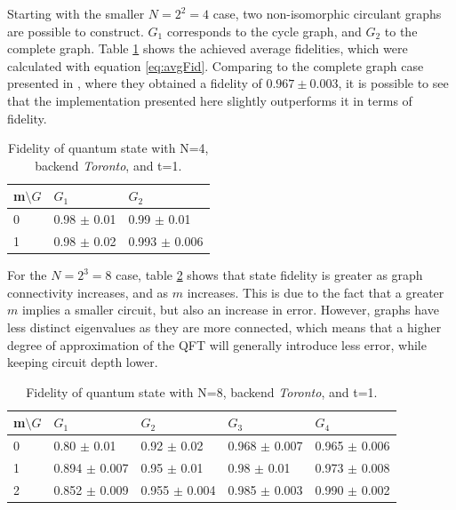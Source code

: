 \documentclass[../../dissertation.tex]{subfiles}
\begin{document}
Starting with the smaller $N = 2^2 = 4$ case, two non-isomorphic circulant
graphs are possible to construct. $G_1$ corresponds to the cycle graph, and
$G_2$ to the complete graph. Table \ref{tab:N2TRT} shows the achieved average
fidelities, which were calculated with equation \ref{eq:avgFid}. Comparing to
the complete graph case presented in \cite{qiang2016}, where they obtained a
fidelity of $0.967 \pm 0.003$, it is possible to see that the implementation
presented here slightly outperforms it in terms of fidelity.
\begin{table}[!h]
\centering
\begin{tabular}{| l | l | l |}
\hline
m$\setminus G$ & $G_1$               & $G_2$  \\ \hline
0   & 0.98 $\pm$ 0.01 & 0.99 $\pm$ 0.01  \\\hline
1   & 0.98 $\pm$ 0.02 & 0.993 $\pm$ 0.006   \\\hline
\end{tabular}
\caption{Fidelity of quantum state with N=4, backend \textit{Toronto}, and t=1.}
\label{tab:N2TRT}
\end{table}\par

For the $N = 2^3 = 8$ case, table \ref{tab:N3TRT} shows that state fidelity is
greater as graph connectivity increases, and as $m$ increases. This is due to
the fact that a greater $m$ implies a smaller circuit, but also an increase in
error. However, graphs have less distinct eigenvalues as they are more
connected, which means that a higher degree of approximation of the QFT will
generally introduce less error, while keeping circuit depth
lower.
\begin{table}[!h]
\centering
\begin{tabular}{| l | l | l | l | l |}
\hline
m$\setminus G$ & $G_1$                & $G_2$                & $G_3$                & $G_4$    \\\hline
0   & 0.80 $\pm$ 0.01 & 0.92 $\pm$ 0.02     & 0.968 $\pm$ 0.007  & 0.965 $\pm$ 0.006 \\\hline
1   & 0.894 $\pm$ 0.007 & 0.95 $\pm$ 0.01   & 0.98 $\pm$ 0.01    & 0.973 $\pm$ 0.008 \\\hline
2   & 0.852 $\pm$ 0.009 & 0.955 $\pm$ 0.004 & 0.985 $\pm$ 0.003  & 0.990 $\pm$ 0.002 \\\hline
\end{tabular}
\caption{Fidelity of quantum state with N=8, backend \textit{Toronto}, and t=1.}
\label{tab:N3TRT}
\end{table}\par
\end{document}
